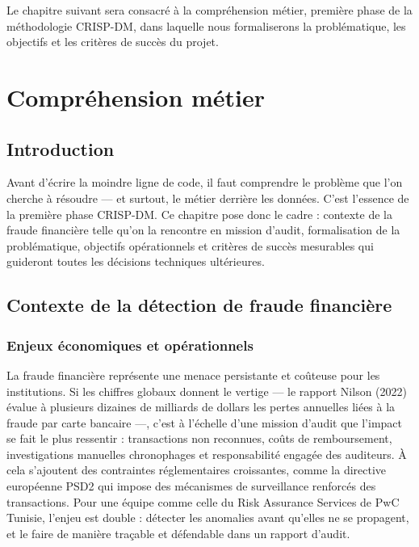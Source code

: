 \documentclass[12pt,a4paper,twoside]{report}
\begin{document}
Le chapitre suivant sera consacré à la compréhension métier, première phase de la méthodologie CRISP-DM, dans laquelle nous formaliserons la problématique, les objectifs et les critères de succès du projet.

\chapter{Compréhension métier}

\section{Introduction}

Avant d'écrire la moindre ligne de code, il faut comprendre le problème que l'on cherche à résoudre --- et surtout, le métier derrière les données. C'est l'essence de la première phase CRISP-DM. Ce chapitre pose donc le cadre : contexte de la fraude financière telle qu'on la rencontre en mission d'audit, formalisation de la problématique, objectifs opérationnels et critères de succès mesurables qui guideront toutes les décisions techniques ultérieures.

\section{Contexte de la détection de fraude financière}

\subsection{Enjeux économiques et opérationnels}

La fraude financière représente une menace persistante et coûteuse pour les institutions. Si les chiffres globaux donnent le vertige --- le rapport Nilson (2022) évalue à plusieurs dizaines de milliards de dollars les pertes annuelles liées à la fraude par carte bancaire ---, c'est à l'échelle d'une mission d'audit que l'impact se fait le plus ressentir : transactions non reconnues, coûts de remboursement, investigations manuelles chronophages et responsabilité engagée des auditeurs. À cela s'ajoutent des contraintes réglementaires croissantes, comme la directive européenne PSD2 qui impose des mécanismes de surveillance renforcés des transactions. Pour une équipe comme celle du Risk Assurance Services de PwC Tunisie, l'enjeu est double : détecter les anomalies avant qu'elles ne se propagent, et le faire de manière traçable et défendable dans un rapport d'audit.
\end{document}
